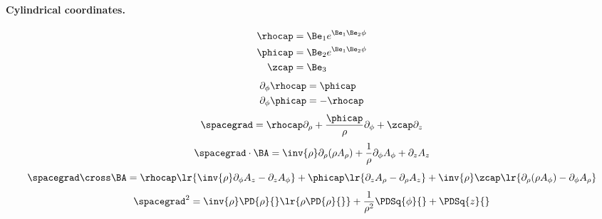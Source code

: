 \paragraph{Cylindrical coordinates.}
%
\begin{equation}\label{eqn:usefulFormulas:720}
\begin{aligned}
\rhocap &= \Be_1 e^{\Be_1 \Be_2 \phi} \\
\phicap &= \Be_2 e^{\Be_1 \Be_2 \phi} \\
\zcap &= \Be_3
\end{aligned}
\end{equation}
%
\begin{equation}\label{eqn:usefulFormulas:740}
\begin{aligned}
\partial_\phi \rhocap &= \phicap \\
\partial_\phi \phicap &= -\rhocap
\end{aligned}
\end{equation}
%
\begin{dmath}\label{eqn:usefulFormulas:760}
\spacegrad = \rhocap \partial_\rho + \frac{\phicap}{\rho} \partial_\phi + \zcap \partial_z
\end{dmath}
%
\begin{dmath}\label{eqn:usefulFormulas:780}
\spacegrad \cdot \BA
=
\inv{\rho} \partial_\rho (\rho A_\rho) + \frac{1}{\rho} \partial_\phi A_\phi + \partial_z A_z
\end{dmath}
%
\begin{dmath}\label{eqn:usefulFormulas:800}
\spacegrad \cross \BA
=
\rhocap
\lr{
   \inv{\rho} \partial_\phi A_z
   - \partial_z A_\phi
}
+
\phicap
\lr{
   \partial_z A_\rho
   -\partial_\rho A_z
}
+
\inv{\rho} \zcap \lr{
   \partial_\rho ( \rho A_\phi )
   - \partial_\phi A_\rho
}
\end{dmath}
%
\begin{dmath}\label{eqn:usefulFormulas:820}
\spacegrad^2
=
\inv{\rho} \PD{\rho}{} \lr{ \rho \PD{\rho}{} }
+ \frac{1}{\rho^2} \PDSq{\phi}{}
+ \PDSq{z}{}
\end{dmath}
%
